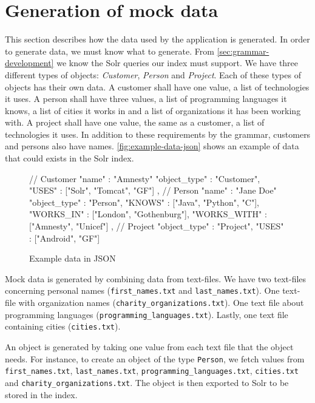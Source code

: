 \section{Generation of mock data}
This section describes how the data used by the application is generated. In order to generate data, we must know what to generate. From \autoref{sec:grammar-development} we know the Solr queries our index must support. We have three different types of objects: \emph{Customer}, \emph{Person} and \emph{Project}. Each of these types of objects has their own data. A customer shall have one value, a list of technologies it uses. A person shall have three values, a list of programming languages it knows, a list of cities it works in and a list of organizations it has been working with. A project shall have one value, the same as a customer, a list of technologies it uses. In addition to these requirements by the grammar, customers and persons also have names. \autoref{fig:example-data-json} shows an example of data that could exists in the Solr index.

\begin{figure}[H]
\begin{js-code}
{ // Customer
  "name" : "Amnesty"
  "object_type" : "Customer",
  "USES" : ["Solr", "Tomcat", "GF"]
},
{ // Person
  "name" : "Jane Doe"
  "object_type" : "Person",
  "KNOWS" : ["Java", "Python", "C"],
  "WORKS_IN" : ["London", "Gothenburg"],
  "WORKS_WITH" :  ["Amnesty", "Unicef"]
},
{ // Project
  "object_type" : "Project",
  "USES" : ["Android", "GF"]
}
\end{js-code}
\caption{Example data in JSON\label{fig:example-data-json}}
\end{figure}

Mock data is generated by combining data from text-files. We have two text-files concerning personal names (\texttt{first\_names.txt} and \texttt{last\_names.txt}). One text-file with organization names (\texttt{charity\_organizations.txt}). One text file about programming languages (\texttt{programming\_languages.txt}). Lastly, one text file containing cities (\texttt{cities.txt}). 

An object is generated by taking one value from each text file that the object needs. For instance, to create an object of the type \texttt{Person}, we fetch values from \texttt{first\_names.txt}, \texttt{last\_names.txt}, \texttt{programming\_languages.txt}, \texttt{cities.txt} and \texttt{charity\_organizations.txt}. The object is then exported to Solr to be stored in the index.